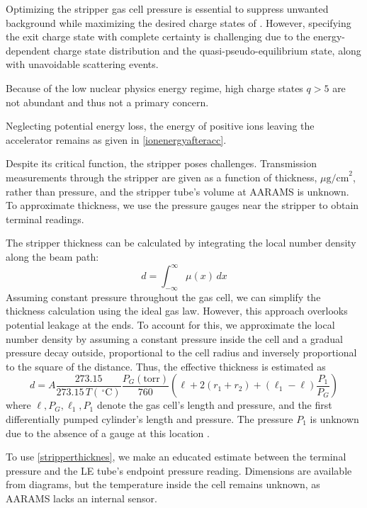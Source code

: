 Optimizing the stripper gas cell pressure is essential to suppress unwanted background while maximizing the desired charge states of . However, specifying the exit charge state with complete certainty is challenging due to the energy-dependent charge state distribution and the quasi-pseudo-equilibrium state, along with unavoidable scattering events.

Because of the low nuclear physics energy regime, high charge states \(q>5\) are not abundant and thus not a primary concern.

Neglecting potential energy loss, the energy of positive ions leaving the accelerator remains as given in \cref{ionenergyafteracc}.

Despite its critical function, the stripper poses challenges. Transmission measurements through the stripper are given as a function of thickness, \(\mu \text{g/cm}^{2}\), rather than pressure, and the stripper tube’s volume at AARAMS is unknown. To approximate thickness, we use the pressure gauges near the stripper to obtain terminal readings.

The stripper thickness can be calculated by integrating the local number density along the beam path:
\begin{equation}
    d = \int^{\infty}_{-\infty} \mu(x) \, dx
\end{equation}
Assuming constant pressure throughout the gas cell, we can simplify the thickness calculation using the ideal gas law. However, this approach overlooks potential leakage at the ends. To account for this, we approximate the local number density by assuming a constant pressure inside the cell and a gradual pressure decay outside, proportional to the cell radius and inversely proportional to the square of the distance. Thus, the effective thickness is estimated as
\begin{equation}
    d = A \frac{273.15}{273.15 \, T(\,^{\circ}\text{C})} \frac{P_{G}(\text{torr})}{760} \left( \ell + 2(r_{1}+r_{2})+(\ell_{1}-\ell)\frac{P_{1}}{P_{G}} \right)\label{stripperthicknes}
\end{equation}
where \(\ell, P_{G}, \ell_{1}, P_{1}\) denote the gas cell's length and pressure, and the first differentially pumped cylinder’s length and pressure. The pressure \(P_{1}\) is unknown due to the absence of a gauge at this location \cite{peterrømermøller}.

To use \cref{stripperthicknes}, we make an educated estimate between the terminal pressure and the LE tube's endpoint pressure reading. Dimensions are available from diagrams, but the temperature inside the cell remains unknown, as AARAMS lacks an internal sensor.


